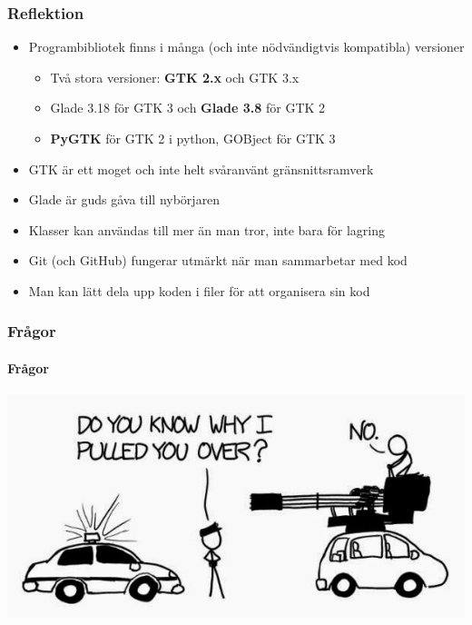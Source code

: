 \documentclass{beamer}
\begin{document}
\begin{frame}
    \frametitle{Reflektion}
    
    \begin{itemize}
        \item Programbibliotek finns i många (och inte nödvändigtvis kompatibla) versioner
        \begin{itemize}
            \item Två stora versioner: \textbf{GTK 2.x} och GTK 3.x
            \item Glade 3.18 för GTK 3 och \textbf{Glade 3.8} för GTK 2
            \item \textbf{PyGTK} för GTK 2 i python, GOBject för GTK 3
        \end{itemize}
        \pause
        \item GTK är ett moget och inte helt svåranvänt gränsnittsramverk
        \pause
        \item Glade är guds gåva till nybörjaren
        \pause
        \item Klasser kan användas till mer än man tror, inte bara för lagring
        \pause
        \item Git (och GitHub) fungerar utmärkt när man sammarbetar med kod
        \pause
        \item Man kan lätt dela upp koden i filer för att organisera sin kod
    \end{itemize}
\end{frame}

\begin{frame}
    \frametitle{Frågor}
    \framesubtitle{Frågor}
    \includegraphics[width=\textwidth]{xkcd.jpg}
\end{frame}
\end{document}

